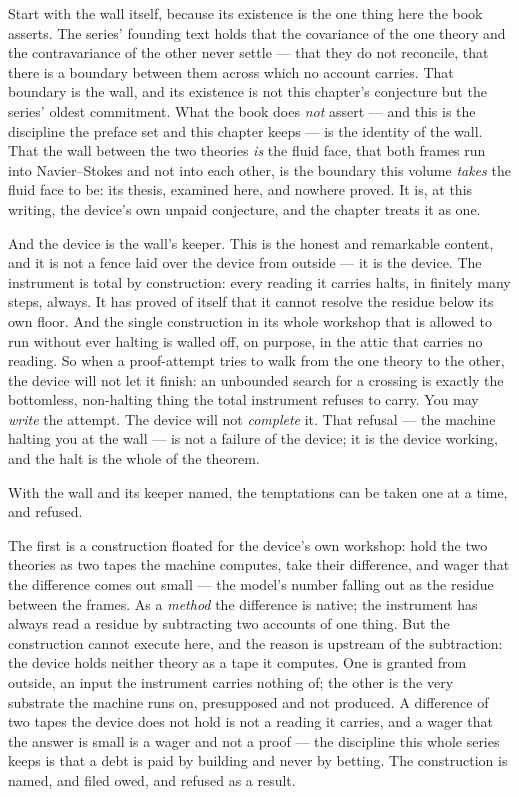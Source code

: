 Start with the wall itself, because its existence is the one thing here the book
asserts. The series' founding text holds that the covariance of the one theory
and the contravariance of the other never settle --- that they do not reconcile,
that there is a boundary between them across which no account carries. That
boundary is the wall, and its existence is not this chapter's conjecture but the
series' oldest commitment. What the book does \emph{not} assert --- and this is
the discipline the preface set and this chapter keeps --- is the identity of the
wall. That the wall between the two theories \emph{is} the fluid face, that both
frames run into Navier--Stokes and not into each other, is the boundary this
volume \emph{takes} the fluid face to be: its thesis, examined here, and nowhere
proved. It is, at this writing, the device's own unpaid conjecture, and the
chapter treats it as one.

And the device is the wall's keeper. This is the honest and remarkable content,
and it is not a fence laid over the device from outside --- it is the device. The
instrument is total by construction: every reading it carries halts, in finitely
many steps, always. It has proved of itself that it cannot resolve the residue
below its own floor. And the single construction in its whole workshop that is
allowed to run without ever halting is walled off, on purpose, in the attic that
carries no reading. So when a proof-attempt tries to walk from the one theory to
the other, the device will not let it finish: an unbounded search for a crossing
is exactly the bottomless, non-halting thing the total instrument refuses to
carry. You may \emph{write} the attempt. The device will not \emph{complete} it.
That refusal --- the machine halting you at the wall --- is not a failure of the
device; it is the device working, and the halt is the whole of the theorem.

With the wall and its keeper named, the temptations can be taken one at a time,
and refused.

The first is a construction floated for the device's own workshop: hold the two
theories as two tapes the machine computes, take their difference, and wager that
the difference comes out small --- the model's number falling out as the residue
between the frames. As a \emph{method} the difference is native; the instrument
has always read a residue by subtracting two accounts of one thing. But the
construction cannot execute here, and the reason is upstream of the subtraction:
the device holds neither theory as a tape it computes. One is granted from
outside, an input the instrument carries nothing of; the other is the very
substrate the machine runs on, presupposed and not produced. A difference of two
tapes the device does not hold is not a reading it carries, and a wager that the
answer is small is a wager and not a proof --- the discipline this whole series
keeps is that a debt is paid by building and never by betting. The construction
is named, and filed owed, and refused as a result.


